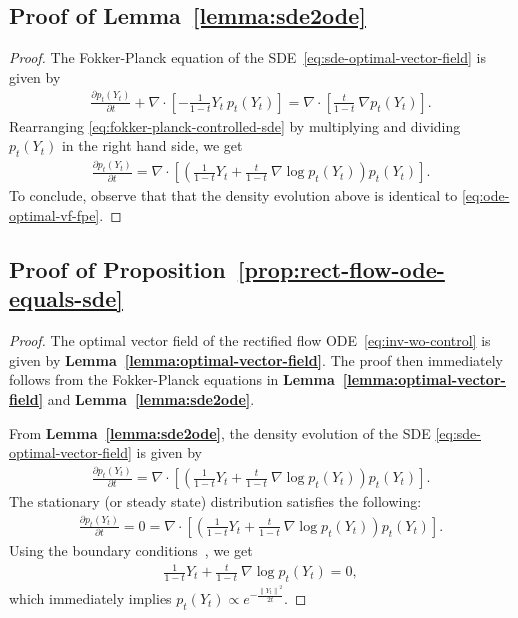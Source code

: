 \documentclass{article} %
\theoremstyle{plain}
\begin{document}
\subsection{Proof of Lemma~\ref{lemma:sde2ode}}
\label{sec:proofs-lemma-sde2ode}
\begin{proof}
The Fokker-Planck equation of the SDE~\eqref{eq:sde-optimal-vector-field} is given by
\begin{align}
    \label{eq:fokker-planck-controlled-sde}
    \frac{\partial p_t(Y_t)}{\partial t} + \nabla \cdot \left[ - \frac{1}{1-t}Y_t~p_t(Y_t) \right] = \nabla \cdot \left[ \frac{t}{1-t}~\nabla p_t(Y_t) \right].
\end{align}
Rearranging \eqref{eq:fokker-planck-controlled-sde} by multiplying and dividing $p_t(Y_t)$ in the right hand side, we get
\begin{align}
    \label{eq:fokker-planck-controlled-sde-1}
    \frac{\partial p_t(Y_t)}{\partial t} = \nabla \cdot \left[\left( \frac{1}{1-t}Y_t + \frac{t}{1-t}~\nabla \log p_t(Y_t) \right)p_t(Y_t)\right].
\end{align}
To conclude, observe  that that the density evolution above is identical to \eqref{eq:ode-optimal-vf-fpe}. 
\end{proof}

\subsection{Proof of Proposition~\ref{prop:rect-flow-ode-equals-sde}}
\label{sec:proofs-prop-rect-flow-ode-equals-sde}
\begin{proof}
The optimal vector field of the rectified flow ODE~\eqref{eq:inv-wo-control} is given by \textbf{Lemma~\ref{lemma:optimal-vector-field}}. The proof then immediately follows from the Fokker-Planck equations in \textbf{Lemma~\ref{lemma:optimal-vector-field}} and \textbf{Lemma~\ref{lemma:sde2ode}}.

From \textbf{Lemma~\ref{lemma:sde2ode}}, the density evolution of the SDE \eqref{eq:sde-optimal-vector-field} is given by 
 \begin{align*}
    \frac{\partial p_t(Y_t)}{\partial t} = \nabla \cdot \left[\left( \frac{1}{1-t}Y_t + \frac{t}{1-t}~\nabla \log p_t(Y_t) \right)p_t(Y_t)\right].
 \end{align*}
The stationary (or steady state) distribution  satisfies the following:
 \begin{align*}
     \frac{\partial p_t(Y_t)}{\partial t}=0=\nabla \cdot \left[\left( \frac{1}{1-t}Y_t + \frac{t}{1-t}~\nabla \log p_t(Y_t) \right)p_t(Y_t)\right].
 \end{align*}
Using the boundary conditions~\citep{oksendal2003stochastic}, we get
\begin{align*}
    \frac{1}{1-t}Y_t + \frac{t}{1-t}~\nabla \log p_t(Y_t) = 0,
\end{align*}
which immediately implies $p_t(Y_t) \propto e^{-\frac{\left\|Y_t\right\|^2}{2t}}$.
\end{proof}
\end{document}
